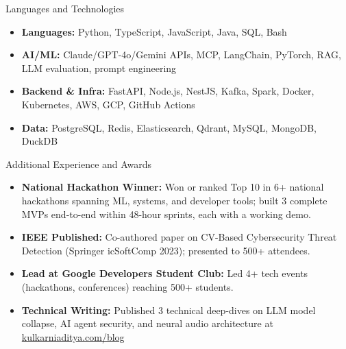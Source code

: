 \documentclass[]{mcdowellcv}
\begin{document}
\begin{cvsection}{Languages and Technologies}
  \begin{cvsubsection}{}{}{}
    \begin{itemize}
      \item \textbf{Languages:} Python, TypeScript, JavaScript, Java, SQL, Bash
      \item \textbf{AI/ML:} Claude/GPT-4o/Gemini APIs, MCP, LangChain, PyTorch, RAG, LLM evaluation, prompt engineering
      \item \textbf{Backend \& Infra:} FastAPI, Node.js, NestJS, Kafka, Spark, Docker, Kubernetes, AWS, GCP, GitHub Actions
      \item \textbf{Data:} PostgreSQL, Redis, Elasticsearch, Qdrant, MySQL, MongoDB, DuckDB
    \end{itemize}
  \end{cvsubsection}
\end{cvsection}

\begin{cvsection}{Additional Experience and Awards}
  \begin{cvsubsection}{}{}{}
    \begin{itemize}
      \item \textbf{National Hackathon Winner:} Won or ranked Top 10 in 6+ national hackathons spanning ML, systems, and developer tools; built 3 complete MVPs end-to-end within 48-hour sprints, each with a working demo.
      \item \textbf{IEEE Published:} Co-authored paper on CV-Based Cybersecurity Threat Detection (Springer icSoftComp 2023); presented to 500+ attendees.
      \item \textbf{Lead at Google Developers Student Club:} Led 4+ tech events (hackathons, conferences) reaching 500+ students.
      \item \textbf{Technical Writing:} Published 3 technical deep-dives on LLM model collapse, AI agent security, and neural audio architecture at \href{https://www.kulkarniaditya.com/blog}{kulkarniaditya.com/blog}
    \end{itemize}
  \end{cvsubsection}
\end{cvsection}
\end{document}
